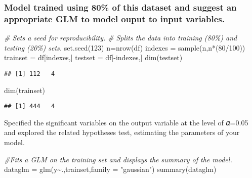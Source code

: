 \documentclass[
]{article}
\newenvironment{Shaded}{\begin{snugshade}}{\end{snugshade}}
\newcommand{\AttributeTok}[1]{\textcolor[rgb]{0.77,0.63,0.00}{#1}}
\newcommand{\CommentTok}[1]{\textcolor[rgb]{0.56,0.35,0.01}{\textit{#1}}}
\newcommand{\DecValTok}[1]{\textcolor[rgb]{0.00,0.00,0.81}{#1}}
\newcommand{\FunctionTok}[1]{\textcolor[rgb]{0.00,0.00,0.00}{#1}}
\newcommand{\NormalTok}[1]{#1}
\newcommand{\OtherTok}[1]{\textcolor[rgb]{0.56,0.35,0.01}{#1}}
\newcommand{\SpecialCharTok}[1]{\textcolor[rgb]{0.00,0.00,0.00}{#1}}
\newcommand{\StringTok}[1]{\textcolor[rgb]{0.31,0.60,0.02}{#1}}
\begin{document}
\hypertarget{model-trained-using-80-of-this-dataset-and-suggest-an-appropriate-glm-to-model-ouput-to-input-variables.}{%
\subsubsection{Model trained using 80\% of this dataset and suggest an
appropriate GLM to model ouput to input
variables.}\label{model-trained-using-80-of-this-dataset-and-suggest-an-appropriate-glm-to-model-ouput-to-input-variables.}}

\begin{Shaded}
\begin{Highlighting}[]
\CommentTok{\# Sets a seed for reproducibility.}
\CommentTok{\# Splits the data into training (80\%) and testing (20\%) sets.}
\FunctionTok{set.seed}\NormalTok{(}\DecValTok{123}\NormalTok{)}
\NormalTok{n}\OtherTok{=}\FunctionTok{nrow}\NormalTok{(df)}
\NormalTok{indexes }\OtherTok{=} \FunctionTok{sample}\NormalTok{(n,n}\SpecialCharTok{*}\NormalTok{(}\DecValTok{80}\SpecialCharTok{/}\DecValTok{100}\NormalTok{))}
\NormalTok{trainset }\OtherTok{=}\NormalTok{ df[indexes,]}
\NormalTok{testset }\OtherTok{=}\NormalTok{ df[}\SpecialCharTok{{-}}\NormalTok{indexes,]}
\FunctionTok{dim}\NormalTok{(testset)}
\end{Highlighting}
\end{Shaded}

\begin{verbatim}
## [1] 112   4
\end{verbatim}

\begin{Shaded}
\begin{Highlighting}[]
\FunctionTok{dim}\NormalTok{(trainset)}
\end{Highlighting}
\end{Shaded}

\begin{verbatim}
## [1] 444   4
\end{verbatim}

Specified the significant variables on the output variable at the level
of 𝛼=0.05 and explored the related hypotheses test, estimating the
parameters of your model.

\begin{Shaded}
\begin{Highlighting}[]
\CommentTok{\#Fits a GLM on the training set and displays the summary of the model.}
\NormalTok{dataglm }\OtherTok{=} \FunctionTok{glm}\NormalTok{(y}\SpecialCharTok{\textasciitilde{}}\NormalTok{.,trainset,}\AttributeTok{family =} \StringTok{"gaussian"}\NormalTok{)}
\FunctionTok{summary}\NormalTok{(dataglm)}
\end{Highlighting}
\end{Shaded}
\end{document}

